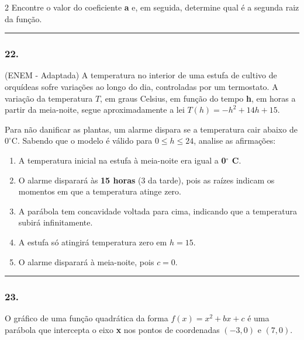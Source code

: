 \documentclass[twoside, 10pt, a4paper]{article}
\newlength{\espacoPreQuestao}
\newlength{\espacoQuestao}
\begin{document}
\begin{multicols*}{2}
Encontre o valor do coeficiente \textbf{a} e, em seguida, determine qual é a segunda raiz da função.
\par\vspace{\espacoQuestao}

\noindent\textcolor{CorLinha}{\rule{\linewidth}{0.5pt}} 
\par\vspace{\espacoPreQuestao}
\subsubsection*{22.} (ENEM - Adaptada) A temperatura no interior de uma estufa de cultivo de orquídeas sofre variações ao longo do dia, controladas por um termostato. A variação da temperatura $T$, em graus Celsius, em função do tempo \textbf{h}, em horas a partir da meia-noite, segue aproximadamente a lei $T(h) = -h^2 + 14h + 15$.

Para não danificar as plantas, um alarme dispara se a temperatura cair abaixo de $0^\circ \text{C}$. Sabendo que o modelo é válido para $0 \le h \le 24$, analise as afirmações:

\begin{enumerate}[label=\alph*)]
    \item A temperatura inicial na estufa à meia-noite era igual a \textbf{0$^\circ$ C}.
    \item O alarme disparará às \textbf{15 horas} (3 da tarde), pois as raízes indicam os momentos em que a temperatura atinge zero.
    \item A parábola tem concavidade voltada para cima, indicando que a temperatura subirá infinitamente.
    \item A estufa só atingirá temperatura zero em $h = 15$.
    \item O alarme disparará à meia-noite, pois $c = 0$.
\end{enumerate}
\par\vspace{\espacoQuestao}

\noindent\textcolor{CorLinha}{\rule{\linewidth}{0.5pt}} 
\par\vspace{\espacoPreQuestao}
\subsubsection*{23.} O gráfico de uma função quadrática da forma $f(x) = x^2 + bx + c$ é uma parábola que intercepta o eixo \textbf{x} nos pontos de coordenadas $(-3, 0)$ e $(7, 0)$.


\end{multicols*}
\end{document}
